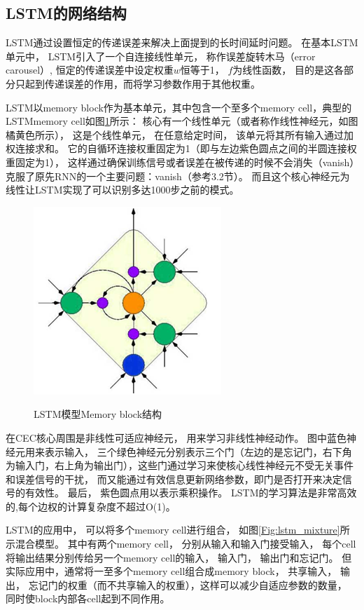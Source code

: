 \subsection{LSTM的网络结构}
LSTM通过设置恒定的传递误差来解决上面提到的长时间延时问题。 在基本LSTM单元中， LSTM引入了一个自连接线性单元， 称作误差旋转木马（error carousel）, 恒定的传递误差中设定权重$w$恒等于1， $f$为线性函数， 目的是这各部分只起到传递误差的作用，而将学习参数作用于其他权重。

LSTM以memory block作为基本单元，其中包含一个至多个memory cell，典型的LSTMmemory cell如图\ref{Fig:lstm_simple}所示：
核心有一个线性单元（或者称作线性神经元，如图橘黄色所示）， 这是个线性单元， 在任意给定时间， 该单元将其所有输入通过加权连接求和。 它的自循环连接权重固定为1（即与左边紫色圆点之间的半圆连接权重固定为1）， 这样通过确保训练信号或者误差在被传递的时候不会消失（vanish）克服了原先RNN的一个主要问题：vanish（参考3.2节）。 而且这个核心神经元为线性让LSTM实现了可以识别多达1000步之前的模式。 


\begin{figure}[htb]
  \centering
  \includegraphics{Pictures/LSTM/lstm_simple.png}\\
  \caption{LSTM模型Memory block结构}\label{Fig:lstm_simple}
\end{figure}

在CEC核心周围是非线性可适应神经元， 用来学习非线性神经动作。 图中蓝色神经元用来表示输入， 三个绿色神经元分别表示三个门（左边的是忘记门，右下角为输入门，右上角为输出门），这些门通过学习来使核心线性神经元不受无关事件和误差信号的干扰， 而又能通过有效信息更新网络参数，即门是否打开来决定信号的有效性。 最后， 紫色圆点用以表示乘积操作。 LSTM的学习算法是非常高效的,每个边权的计算复杂度不超过O(1)。


LSTM的应用中， 可以将多个memory cell进行组合， 如图\ref{Fig:lstm_mixture}所示混合模型。 其中有两个memory cell， 分别从输入和输入门接受输入， 每个cell将输出结果分别传给另一个memory cell的输入， 输入门， 输出门和忘记门。 但实际应用中，通常将一至多个memory cell组合成memory block， 共享输入， 输出， 忘记门的权重（而不共享输入的权重），这样可以减少自适应参数的数量， 同时使block内部各cell起到不同作用。 

